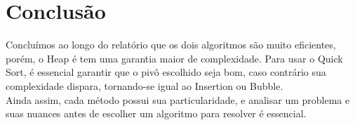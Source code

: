 \documentclass[fontsize=11pt]{article}
\begin{document}
  \section{Conclusão}
  Concluímos ao longo do relatório que os dois algoritmos são muito eficientes,
  porém, o Heap é tem uma garantia maior de complexidade. Para usar o Quick Sort,
  é essencial garantir que o pivô escolhido seja bom, caso contrário sua 
  complexidade dispara, tornando-se igual ao Insertion ou Bubble.
  \\ Ainda assim, cada método possui sua particularidade, e analisar um problema
  e suas nuances antes de escolher um algoritmo para resolver é essencial.
\printbibliography[heading=bibintoc, title={Referências}]
\end{document}
